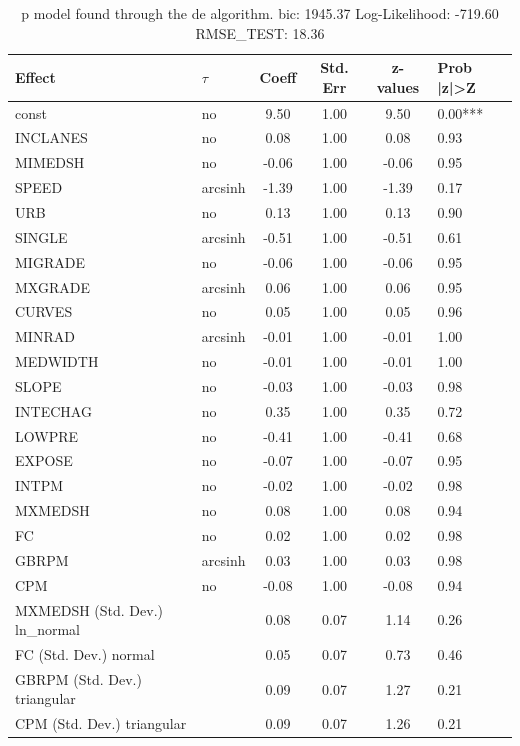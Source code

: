 \begin{table}
	\caption{p model found through the de algorithm. bic: 1945.37 Log-Likelihood: -719.60 RMSE_TEST: 18.36}
	\begin{center}
		\begin{tabular}{|l|l|c|c|c|l|}
			\hline
			Effect & $\tau$ & Coeff & Std. Err & z-values & Prob |z|>Z \\
			\hline
			const & no & 9.50 & 1.00 & 9.50 & 0.00*** \\
			\hline
			INCLANES & no & 0.08 & 1.00 & 0.08 & 0.93 \\
			\hline
			MIMEDSH & no & -0.06 & 1.00 & -0.06 & 0.95 \\
			\hline
			SPEED & arcsinh & -1.39 & 1.00 & -1.39 & 0.17 \\
			\hline
			URB & no & 0.13 & 1.00 & 0.13 & 0.90 \\
			\hline
			SINGLE & arcsinh & -0.51 & 1.00 & -0.51 & 0.61 \\
			\hline
			MIGRADE & no & -0.06 & 1.00 & -0.06 & 0.95 \\
			\hline
			MXGRADE & arcsinh & 0.06 & 1.00 & 0.06 & 0.95 \\
			\hline
			CURVES & no & 0.05 & 1.00 & 0.05 & 0.96 \\
			\hline
			MINRAD & arcsinh & -0.01 & 1.00 & -0.01 & 1.00 \\
			\hline
			MEDWIDTH & no & -0.01 & 1.00 & -0.01 & 1.00 \\
			\hline
			SLOPE & no & -0.03 & 1.00 & -0.03 & 0.98 \\
			\hline
			INTECHAG & no & 0.35 & 1.00 & 0.35 & 0.72 \\
			\hline
			LOWPRE & no & -0.41 & 1.00 & -0.41 & 0.68 \\
			\hline
			EXPOSE & no & -0.07 & 1.00 & -0.07 & 0.95 \\
			\hline
			INTPM & no & -0.02 & 1.00 & -0.02 & 0.98 \\
			\hline
			MXMEDSH & no & 0.08 & 1.00 & 0.08 & 0.94 \\
			\hline
			FC & no & 0.02 & 1.00 & 0.02 & 0.98 \\
			\hline
			GBRPM & arcsinh & 0.03 & 1.00 & 0.03 & 0.98 \\
			\hline
			CPM & no & -0.08 & 1.00 & -0.08 & 0.94 \\
			\hline
			MXMEDSH (Std. Dev.) ln_normal &  & 0.08 & 0.07 & 1.14 & 0.26 \\
			\hline
			FC (Std. Dev.) normal &  & 0.05 & 0.07 & 0.73 & 0.46 \\
			\hline
			GBRPM (Std. Dev.) triangular &  & 0.09 & 0.07 & 1.27 & 0.21 \\
			\hline
			CPM (Std. Dev.) triangular &  & 0.09 & 0.07 & 1.26 & 0.21 \\
			\hline
		\end{tabular}
	\end{center}
\end{table}